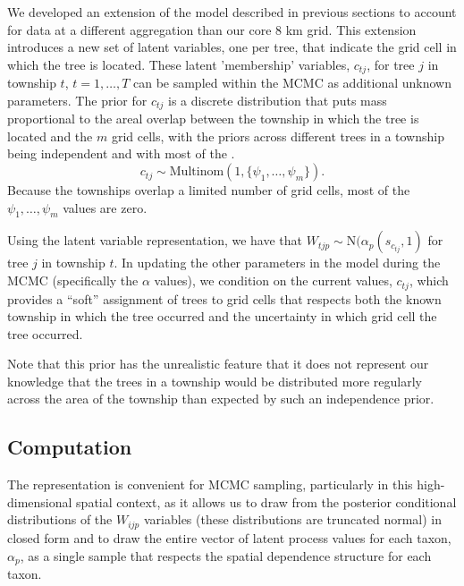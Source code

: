 \documentclass[12pt]{article}\usepackage[]{graphicx}\usepackage[]{color}
\begin{document}
We developed an extension of the model described in previous sections
to account for data at a different aggregation than our core 8 km
grid. This extension introduces a new set of latent variables, one
per tree, that indicate the grid cell in which the tree is located.
These latent 'membership' variables, $c_{tj}$, for tree $j$ in township
$t$, $t=1,\ldots,T$ can be sampled within the MCMC as additional
unknown parameters. The prior for $c_{tj}$ is a discrete distribution
that puts mass proportional to the areal overlap between the township
in which the tree is located and the $m$ grid cells, with the priors
across different trees in a township being independent and with most
of the . 
\[
c_{tj}\sim\mbox{Multinom}(1,\{\psi_{1},\ldots,\psi_{m}\}).
\]
Because the townships overlap a limited number of grid cells, most
of the $\psi_{1},\ldots,\psi_{m}$ values are zero.

Using the latent variable representation, we have that $W_{tjp}\sim\mbox{N}(\alpha_{p}(s_{c_{tj}},1)$
for tree $j$ in township $t$. In updating the other parameters in
the model during the MCMC (specifically the $\alpha$ values), we
condition on the current values, $c_{tj}$, which provides a ``soft''
assignment of trees to grid cells that respects both the known township
in which the tree occurred and the uncertainty in which grid cell
the tree occurred.

Note that this prior has the unrealistic feature that it does not
represent our knowledge that the trees in a township would be distributed
more regularly across the area of the township than expected by such
an independence prior.


\subsection{Computation}

The \cite{McCu:Ross:1994} representation is convenient for MCMC sampling,
particularly in this high-dimensional spatial context, as it allows
us to draw from the posterior conditional distributions of the $W_{ijp}$
variables (these distributions are truncated normal) in closed form
and to draw the entire vector of latent process values for each taxon,
$\alpha_{p}$, as a single sample that respects the spatial dependence
structure for each taxon.
\end{document}
